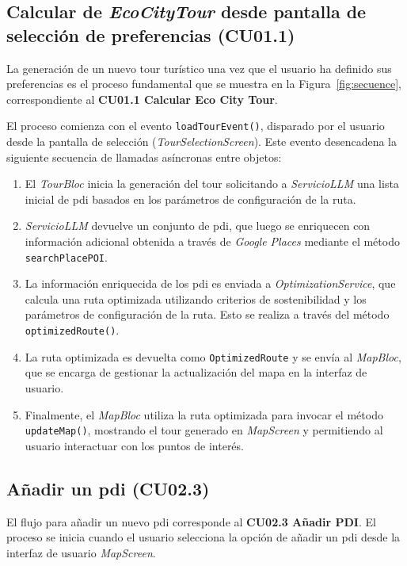 \subsection{Calcular de \textit{EcoCityTour} desde pantalla de selección de preferencias (CU01.1)}
La generación de un nuevo tour turístico una vez que el usuario ha definido sus preferencias es el proceso fundamental que se muestra en la Figura~\ref{fig:secuence}, correspondiente al \textbf{CU01.1 Calcular Eco City Tour}.

El proceso comienza con el evento \texttt{loadTourEvent()}, disparado por el usuario desde la pantalla de selección (\textit{TourSelectionScreen}). Este evento desencadena la siguiente secuencia de llamadas asíncronas entre objetos:
\begin{enumerate}
	\item El \textit{TourBloc} inicia la generación del tour solicitando a \textit{ServicioLLM} una lista inicial de \acrlong{pdi} basados en los parámetros de configuración de la ruta.
	\item \textit{ServicioLLM} devuelve un conjunto de \acrlong{pdi}, que luego se enriquecen con información adicional obtenida a través de \textit{Google Places} mediante el método \texttt{searchPlacePOI}.
	\item La información enriquecida de los \acrlong{pdi} es enviada a \textit{OptimizationService}, que calcula una ruta optimizada utilizando criterios de sostenibilidad y los parámetros de configuración de la ruta. Esto se realiza a través del método \texttt{optimizedRoute()}.
	\item La ruta optimizada es devuelta como \texttt{OptimizedRoute} y se envía al \textit{MapBloc}, que se encarga de gestionar la actualización del mapa en la interfaz de usuario.
	\item Finalmente, el \textit{MapBloc} utiliza la ruta optimizada para invocar el método \texttt{updateMap()}, mostrando el tour generado en \textit{MapScreen} y permitiendo al usuario interactuar con los puntos de interés.
\end{enumerate}

\subsection{Añadir un \acrfull{pdi} (CU02.3)}
El flujo para añadir un nuevo \acrshort{pdi} corresponde al \textbf{CU02.3 Añadir PDI}. El proceso se inicia cuando el usuario selecciona la opción de añadir un \acrshort{pdi} desde la interfaz de usuario \textit{MapScreen}. 

